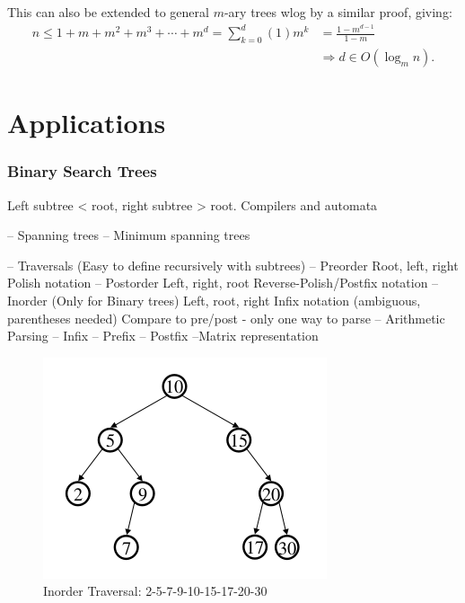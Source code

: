 \documentclass[a4paper,10pt]{report}
\begin{document}
This can also be extended to general $m$-ary trees wlog by a similar proof, giving:
\begin{align*}
	n \leq 1 + m + m^2 + m^3 + \cdots + m^d = \sum_{k=0}^d (1)m^k &=\frac{1-m^{d-1}}{1-m}\\
	&\Rightarrow d \in O(\log_m n).
\end{align*}

\chapter{Applications}
\subsection{Binary Search Trees}
Left subtree < root, right subtree > root.
Compilers and automata

 -- Spanning trees
	-- Minimum spanning trees

 -- Traversals (Easy to define recursively with subtrees)
	-- Preorder
		Root, left, right
		Polish notation
	-- Postorder
		Left, right, root
		Reverse-Polish/Postfix notation
	-- Inorder (Only for Binary trees)
		Left, root, right
		Infix notation (ambiguous, parentheses needed)
			Compare to pre/post - only one way to parse
-- Arithmetic Parsing
	-- Infix
	-- Prefix
	-- Postfix
--Matrix representation

\begin{figure}[h!]
	\begin{centering}
	\begin{center}
	\includegraphics[width=\linewidth]{./Pictures/Inorder.png}
	\caption{Inorder Traversal: 2-5-7-9-10-15-17-20-30}
	\label{fig:??????}
	\end{center}
	\par\end{centering}
\end{figure}
\end{document}
